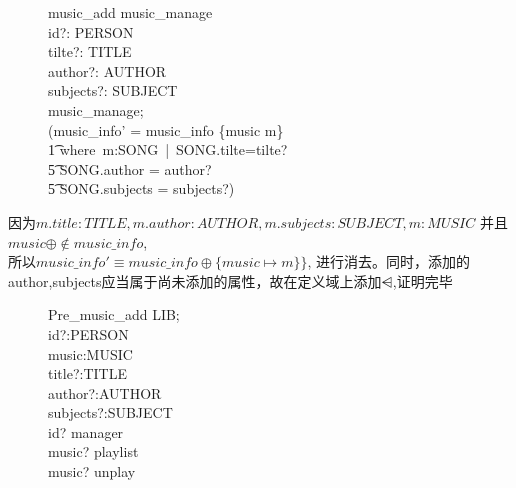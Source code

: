 \documentclass[14pt]{article}
\numberwithin{figure}{subsection}
\begin{document}
\begin{figure}[H]
    \setlength{\abovecaptionskip}{0.cm}
    \setlength{\belowcaptionskip}{0.cm}
    \begin{schema}{music\_add}
        music\_manage\\
        id?: \power PERSON\\
        tilte?: TITLE\\
        author?: \finset AUTHOR\\
        subjects?: \finset SUBJECT\\
        \where
        \exists music\_manage; \bullet \\
        (music\_info' = music\_info \oplus \{music \mapsto m\}\\
        \t1 where\ m:SONG\ |\ SONG.tilte=tilte?\\
        \t5 \quad SONG.author = author?\\
        \t5 \quad SONG.subjects = subjects?)
    \end{schema}
\end{figure}

\vspace{-0.7CM}
因为$m.title:TITLE,m.author:AUTHOR,m.subjects:SUBJECT,m:MUSIC$
并且$music\oplus \not \in music\_info$,\\所以$music\_info'\equiv music\_info \oplus \{music\mapsto m\}\}$,
进行消去。同时，添加的author,subjects应当属于尚未添加的属性，故在定义域上添加$\ndres$,证明完毕

\vspace{-0.7cm}
\begin{figure}[H]
    \setlength{\abovecaptionskip}{0.cm}
    \setlength{\belowcaptionskip}{0.cm}
    \begin{schema}{Pre\_music\_add}
        LIB;\\
        id?:PERSON\\
        music:MUSIC\\
        title?:TITLE\\
        author?:\ndres AUTHOR\\
        subjects?:\ndres SUBJECT\\
        \where
        id? \in manager\\
        music? \not \in playlist\\
        music? \not \in unplay
    \end{schema}
\end{figure}
\end{document}
